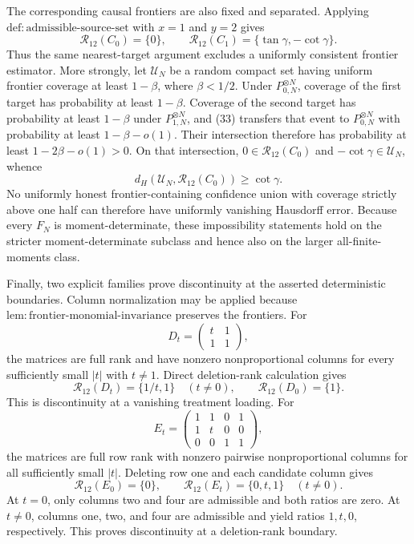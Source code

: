 The corresponding causal frontiers are also fixed and separated. Applying \(\mathrm{def:admissible\text{-}source\text{-}set}\) with \(x=1\) and \(y=2\) gives
\[
 \mathcal R_{12}(C_0)=\{0\},
 \qquad
 \mathcal R_{12}(C_1)=\{\tan\gamma,-\cot\gamma\}. \tag{35}
\]
Thus the same nearest-target argument excludes a uniformly consistent frontier estimator. More strongly, let \(\mathcal U_N\) be a random compact set having uniform frontier coverage at least \(1-\beta\), where \(\beta<1/2\). Under \(P_{0,N}^{\otimes N}\), coverage of the first target has probability at least \(1-\beta\). Coverage of the second target has probability at least \(1-\beta\) under \(P_{1,N}^{\otimes N}\), and (33) transfers that event to \(P_{0,N}^{\otimes N}\) with probability at least \(1-\beta-o(1)\). Their intersection therefore has probability at least \(1-2\beta-o(1)>0\). On that intersection, \(0\in\mathcal R_{12}(C_0)\) and \(-\cot\gamma\in\mathcal U_N\), whence
\[
 d_H(\mathcal U_N,\mathcal R_{12}(C_0))\ge\cot\gamma. \tag{36}
\]
No uniformly honest frontier-containing confidence union with coverage strictly above one half can therefore have uniformly vanishing Hausdorff error. Because every \(F_N\) is moment-determinate, these impossibility statements hold on the stricter moment-determinate subclass and hence also on the larger all-finite-moments class.

Finally, two explicit families prove discontinuity at the asserted deterministic boundaries. Column normalization may be applied because \(\mathrm{lem:frontier\text{-}monomial\text{-}invariance}\) preserves the frontiers. For
\[
 D_t=\begin{pmatrix}t&1\\1&1\end{pmatrix},
\]
the matrices are full rank and have nonzero nonproportional columns for every sufficiently small \(|t|\) with \(t\ne1\). Direct deletion-rank calculation gives
\[
 \mathcal R_{12}(D_t)=\{1/t,1\}\quad(t\ne0),
 \qquad
 \mathcal R_{12}(D_0)=\{1\}. \tag{37}
\]
This is discontinuity at a vanishing treatment loading. For
\[
 E_t=
 \begin{pmatrix}
 1&1&0&1\\
 1&t&0&0\\
 0&0&1&1
 \end{pmatrix},
\]
the matrices are full row rank with nonzero pairwise nonproportional columns for all sufficiently small \(|t|\). Deleting row one and each candidate column gives
\[
 \mathcal R_{12}(E_0)=\{0\},
 \qquad
 \mathcal R_{12}(E_t)=\{0,t,1\}\quad(t\ne0). \tag{38}
\]
At \(t=0\), only columns two and four are admissible and both ratios are zero. At \(t\ne0\), columns one, two, and four are admissible and yield ratios \(1,t,0\), respectively. This proves discontinuity at a deletion-rank boundary.


